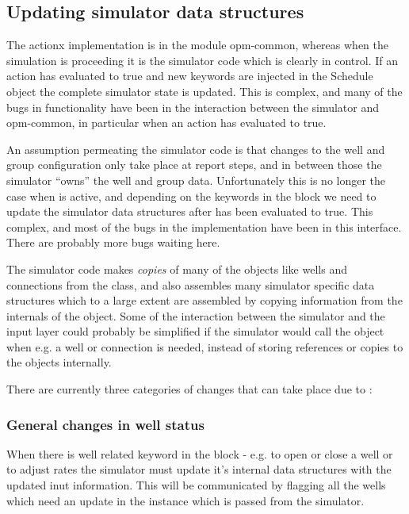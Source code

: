 \subsection{Updating simulator data structures}
The actionx implementation is in the module opm-common, whereas when the
simulation is proceeding it is the simulator code which is clearly in control.
If an action has evaluated to true and new keywords are injected in the Schedule
object the complete simulator state is updated. This is complex, and many of the
bugs in \actionx{} functionality have been in the interaction between the
simulator and opm-common, in particular when an action has evaluated to true.

An assumption permeating the simulator code is that changes to the well and
group configuration only take place at report steps, and in between those the
simulator ``owns'' the well and group data. Unfortunately this is no longer the
case when \actionx{} is active, and depending on the keywords in the \actionx{}
block we need to update the simulator data structures after \actionx{} has been
evaluated to true. This complex, and most of the bugs in the \actionx{}
implementation have been in this interface. There are probably more bugs waiting
here.

The simulator code makes \emph{copies} of many of the objects like wells and
connections from the  class, and also assembles many
simulator specific data structures which to a large extent are assembled by
copying information from the internals of the  object. Some
of the interaction between the simulator and the input layer could probably be
simplified if the simulator would call the  object when
e.g. a well or connection is needed, instead of storing references or copies to
the  objects internally.

There are currently three categories of changes that can take place due to
\actionx{}:


\subsubsection{General changes in well status}
When there is well related keyword in the \actionx{} block - e.g. 
to open or close a well or  to adjust rates the simulator must
update it's internal data structures with the updated inut information. This
will be communicated by flagging all the wells which need an update in the
 instance which is passed from the
simulator.



